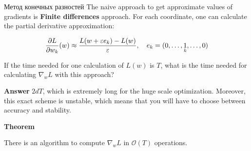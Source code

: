 \documentclass[
  9pt,
  ignorenonframetext,
  aspectratio=169,
]{beamer}
\begin{document}
\begin{frame}{Метод конечных разностей}
\label{ux43cux435ux442ux43eux434-ux43aux43eux43dux435ux447ux43dux44bux445-ux440ux430ux437ux43dux43eux441ux442ux435ux439}
The naive approach to get approximate values of gradients is
\textbf{Finite differences} approach. For each coordinate, one can
calculate the partial derivative approximation:

\[
\dfrac{\partial L}{\partial w_k} (w) \approx \dfrac{L(w+\varepsilon e_k) - L(w)}{\varepsilon}, \quad e_k = (0, \ldots, \underset{{\tiny k}}{1}, \ldots, 0)
\]

\pause

\begin{tcolorbox}[enhanced jigsaw, bottomrule=.15mm, title=\textcolor{quarto-callout-color}{\faInfo}\hspace{0.5em}{Question}, breakable, opacitybacktitle=0.6, colbacktitle=quarto-callout-color!10!white, left=2mm, bottomtitle=1mm, colback=white, colframe=quarto-callout-color-frame, titlerule=0mm, toptitle=1mm, arc=.35mm, rightrule=.15mm, coltitle=black, toprule=.15mm, opacityback=0, leftrule=.75mm]

If the time needed for one calculation of \(L(w)\) is \(T\), what is the
time needed for calculating \(\nabla_w L\) with this approach?

\pause

\textbf{Answer} \(2dT\), which is extremely long for the huge scale
optimization. Moreover, this exact scheme is unstable, which means that
you will have to choose between accuracy and stability.

\pause

\textbf{Theorem}

There is an algorithm to compute \(\nabla_w L\) in \(\mathcal{O}(T)\)
operations. \footnotemark{}

\end{tcolorbox}

\end{frame}
\end{document}

